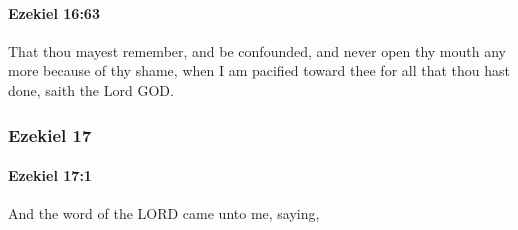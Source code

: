 		\paragraph{Ezekiel 16:63} %
			\label{EZEKIEL-16-63}

			That thou mayest remember, and be confounded, and never open thy mouth any more because of thy shame, when I am pacified toward thee for all that thou hast done, saith the Lord GOD.

	\subsubsection{Ezekiel 17} %
		\label{EZEKIEL-17}

		\paragraph{Ezekiel 17:1} %
			\label{EZEKIEL-17-1}

			And the word of the LORD came unto me, saying,

